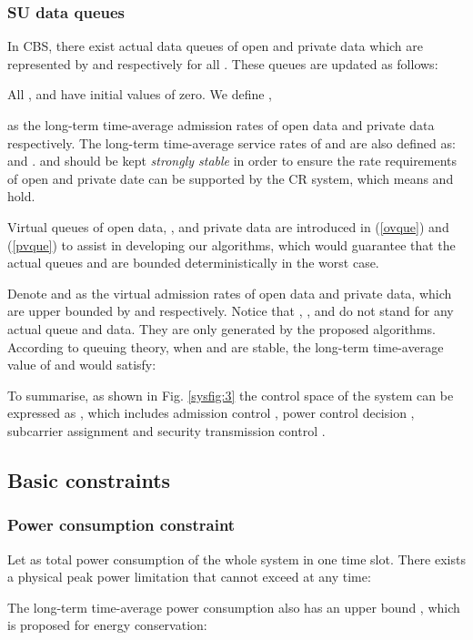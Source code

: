 \documentclass[journal]{IEEEtran}
\begin{document}
 \subsubsection{SU data queues}
In CBS, there exist actual data queues of open and private data which are represented by  and  respectively for all
. These queues  are updated as follows:


All ,  and  have initial values of zero. We define
,

as the long-term time-average admission rates of open data and private data respectively. The long-term time-average service rates of   and  are also defined as:
  and .  and  should be
kept \emph{strongly stable}  in order to ensure the rate requirements of open and private date can be supported by the CR system, which means   and  hold.

Virtual queues of open { data}, , and private data  are introduced in  (\ref{ovque}) and
(\ref{pvque}) to assist in developing our algorithms, which would guarantee that the actual queues  and  are
bounded
deterministically  in the worst case.

Denote  and  as the virtual admission rates of open data and private data, which are upper bounded  by  and  respectively.
Notice that , ,  and  do not stand for any actual queue and data. They are only generated
by the proposed algorithms. According to queuing  theory, when  and   are stable, the  long-term time-average value of
 and   would satisfy:


To summarise, as shown in Fig. \ref{sysfig:3} the control space  of the system can be expressed as , which includes admission control , power control decision , subcarrier assignment  and security transmission control .


\subsection{Basic constraints}




\subsubsection{Power consumption constraint}
Let  as total power consumption of the whole system in one time slot. There exists a
physical peak power limitation  that  cannot exceed at any time:


The long-term time-average power consumption also has an upper bound , which is proposed for energy conservation:
\end{document}
